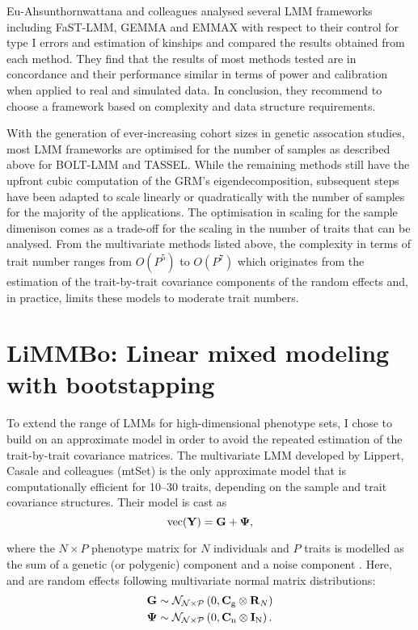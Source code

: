 Eu-Ahsunthornwattana and colleagues \citeyear{Eu-ahsunthornwattana2014} analysed several LMM frameworks including FaST-LMM, GEMMA and EMMAX with respect to their control for type I errors and estimation of kinships and compared the results obtained from each method. They find that the results of most methods tested are in concordance and their performance similar in terms of power and calibration when applied to real and simulated data. In conclusion, they recommend to choose a framework based on complexity and data structure requirements. 

With the generation of ever-increasing cohort sizes in genetic assocation studies, most LMM frameworks are optimised for the number of samples as described above for BOLT-LMM and TASSEL. While the remaining methods still have the upfront cubic computation of the GRM's eigendecomposition, subsequent steps have been adapted to scale linearly or quadratically with the number of samples for the majority of the applications. The optimisation in scaling for the sample dimenison comes as a trade-off for the scaling in the number of traits that can be analysed. From the multivariate methods listed above, the complexity in terms of trait number ranges from \(O(P^5)\) to \(O(P^7)\) which originates from the estimation of the trait-by-trait covariance components of the random effects and, in practice, limits these models to moderate trait numbers.

\section{LiMMBo: Linear mixed modeling with bootstapping}
\label{section:intro-limmbo}
To extend the range of LMMs for high-dimensional phenotype sets, I chose to build on an approximate model in order to avoid the repeated estimation of the trait-by-trait covariance matrices. The multivariate LMM developed by Lippert, Casale and colleagues (mtSet) \citeyear{Lippert2014,Casale2015} is the only approximate model that is computationally efficient for \numrange{10}{30} traits, depending on the sample and trait covariance structures. Their model is cast as
\begin{equation}
\text{vec}(\boldsymbol{\mathbf{Y}}) = \boldsymbol{\mathbf{G}} + \boldsymbol{\mathbf{\Psi}},
\label{eq:vd}
\end{equation}

where the \(N \times P\) phenotype matrix  for \(N\) individuals and \(P\) traits is modelled as the sum of a genetic (or polygenic) component  and a noise component \tmat{\Psi}. Here,  and  are random effects following multivariate normal matrix distributions:
\begin{equation}
\begin{aligned}
\boldsymbol{\mathbf{G}} &\sim\mathcal{N_{N\times P}}\left(0, \boldsymbol{\mathbf{C}}_\text{g} \otimes \boldsymbol{\mathbf{R}}_N\right) \\
\boldsymbol{\mathbf{\Psi}} &\sim\mathcal{N_{N\times P}}\left(0, \boldsymbol{\mathbf{C}}_\text{n} \otimes \boldsymbol{\mathbf{I}}_\text{N}\right).
\end{aligned}
\end{equation}

